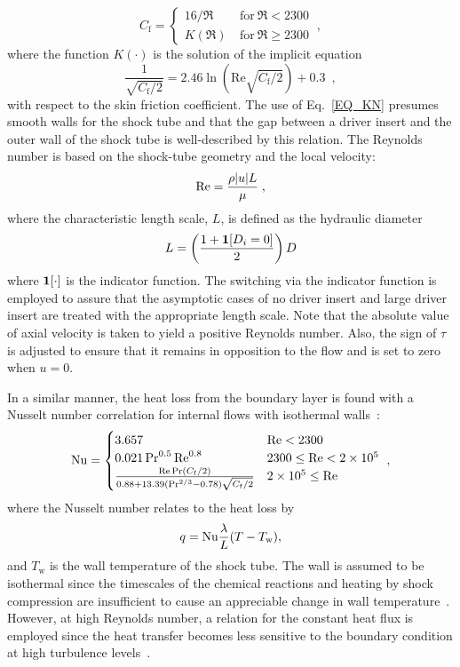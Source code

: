 \begin{equation}
\label{EQ_CF}
C_\mathrm{f}=
\begin{cases}
{16}/{\Re}\ &\text{for}\ \Re<2300 \\
K(\Re)\ &\text{for}\ \Re\ge 2300
\end{cases}\ ,
\end{equation}
where the function $K(\cdot)$ is the solution of the implicit equation
\begin{equation}\label{EQ_KN}
\frac{1}{\sqrt{C_{\mathrm{f}}/2}}=2.46\ln\left(\mathrm{Re}\sqrt{C_{\mathrm{f}}/2}\right)+0.3\;\ ,
\end{equation}	
with respect to the skin friction coefficient. The use of Eq.~\ref{EQ_KN} presumes smooth walls for the shock tube and that the gap between a driver insert and the outer wall of the shock tube is well-described by this relation. The Reynolds number is based on the shock-tube geometry and the local velocity:
\begin{equation}
\label{EQ_RED}
{\rm{Re}}={\frac{\rho |u|L}{\mu}}\; ,
\end{equation}
where the characteristic length scale, $L$, is defined as the hydraulic diameter
\begin{equation}
	L=\left(\frac{1+{\mathbf{1}}[D_i=0]}{2}\right)D
\end{equation}
where ${\mathbf{1}}[\cdot]$ is the indicator function. The switching via the indicator function is employed to assure that the asymptotic cases of no driver insert and large driver insert are treated with the appropriate length scale. Note that the absolute value of axial velocity is taken to yield a positive Reynolds number. Also, the sign of $\tau$ is adjusted to ensure that it remains in opposition to the flow and is set to zero when $u=0$. 

In a similar manner, the heat loss from the boundary layer is found with a Nusselt number correlation for internal flows with isothermal walls~\cite{KAYS_BOOK2005}:
\begin{equation}
\label{EQ_NU}
{\rm{Nu}}=
\begin{cases}
3.657 & {\rm{Re}}<2300 \\
0.021\Pr^{0.5}{\rm{Re}}^{0.8} & 2300\le{\rm{Re}}< 2\times 10^5\\
\frac{{\rm{Re}}\Pr(C_{\mathrm{f}}/2)}{0.88+13.39(\mathrm{Pr}^{2/3}-0.78)\sqrt{C_{\mathrm{f}}/2}} & 2\times 10^5\le {\rm{Re}}
\end{cases}\ ,
\end{equation}
where the Nusselt number relates to the heat loss by
\begin{equation}
q={\rm{Nu}}\frac{\lambda}{L}(T-T_{\mathrm{w}}) ,
\end{equation}
and $T_{\mathrm{w}}$ is the wall temperature of the shock tube. The wall is assumed to be isothermal since the timescales of the chemical reactions and heating by shock compression are insufficient to cause an appreciable change in wall temperature~\cite{MARK_JAS1957}. However, at high Reynolds number, a relation for the constant heat flux is employed since the heat transfer becomes less sensitive to the boundary condition at high turbulence levels~\cite{KAYS_BOOK2005}.
